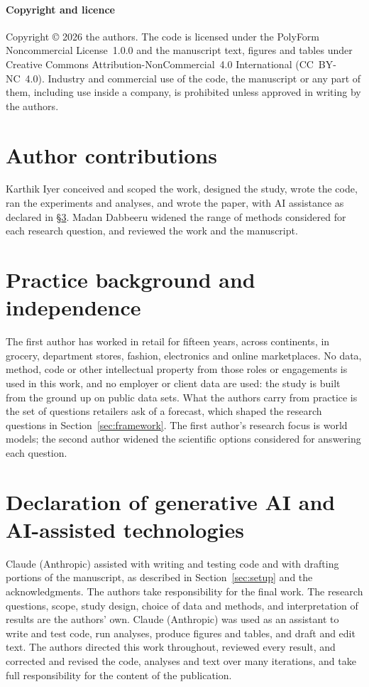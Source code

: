 \paragraph{Copyright and licence}
Copyright \copyright{} 2026 the authors. The code is licensed under the
PolyForm Noncommercial License~1.0.0 and the manuscript text, figures and tables
under Creative Commons Attribution-NonCommercial~4.0 International
(CC~BY-NC~4.0). Industry and commercial use of the code, the manuscript or any
part of them, including use inside a company, is prohibited unless approved in
writing by the authors.

\section{Author contributions}
\label{sec:contributions}
Karthik Iyer conceived and scoped the work, designed the study, wrote the code,
ran the experiments and analyses, and wrote the paper, with AI assistance as
declared in \S\ref{sec:ai}. Madan Dabbeeru widened the range of methods
considered for each research question, and reviewed the work and the
manuscript.

\section{Practice background and independence}
\label{sec:background}
The first author has worked in retail for fifteen years, across continents, in
grocery, department stores, fashion, electronics and online marketplaces. No
data, method, code or other intellectual property from those roles or
engagements is used in this work, and no employer or client data are used: the
study is built from the ground up on public data sets. What the authors carry
from practice is the set of questions retailers ask of a forecast, which shaped
the research questions in Section~\ref{sec:framework}. The first author's
research focus is world models; the second author widened the scientific
options considered for answering each question.
\fi\fi

\section{Declaration of generative AI and AI-assisted technologies}
\label{sec:ai}
\ifjof
Claude (Anthropic) assisted with writing and testing code and with drafting
portions of the manuscript, as described in Section~\ref{sec:setup} and the
acknowledgments. The authors take responsibility for the final work.
\else
The research questions, scope, study design, choice of data and methods, and
interpretation of results are the authors' own. Claude (Anthropic) was used as an
assistant to write and test code, run analyses, produce figures and tables, and
draft and edit text. The authors directed this work throughout, reviewed every
result, and corrected and revised the code, analyses and text over many
iterations, and take full responsibility for the content of the publication.
\fi

\FloatBarrier


\clearpage
\appendix
\ifjournal\else\fi
